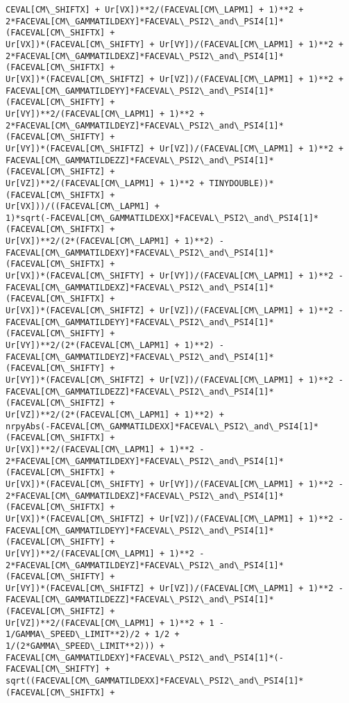 \documentclass[landscape,letterpaper,10pt,english]{article}
\begin{document}
\begin{Verbatim}[commandchars=\\\{\}]
CEVAL[CM\_SHIFTX] + Ur[VX])**2/(FACEVAL[CM\_LAPM1] + 1)**2 +
2*FACEVAL[CM\_GAMMATILDEXY]*FACEVAL\_PSI2\_and\_PSI4[1]*(FACEVAL[CM\_SHIFTX] +
Ur[VX])*(FACEVAL[CM\_SHIFTY] + Ur[VY])/(FACEVAL[CM\_LAPM1] + 1)**2 +
2*FACEVAL[CM\_GAMMATILDEXZ]*FACEVAL\_PSI2\_and\_PSI4[1]*(FACEVAL[CM\_SHIFTX] +
Ur[VX])*(FACEVAL[CM\_SHIFTZ] + Ur[VZ])/(FACEVAL[CM\_LAPM1] + 1)**2 +
FACEVAL[CM\_GAMMATILDEYY]*FACEVAL\_PSI2\_and\_PSI4[1]*(FACEVAL[CM\_SHIFTY] +
Ur[VY])**2/(FACEVAL[CM\_LAPM1] + 1)**2 +
2*FACEVAL[CM\_GAMMATILDEYZ]*FACEVAL\_PSI2\_and\_PSI4[1]*(FACEVAL[CM\_SHIFTY] +
Ur[VY])*(FACEVAL[CM\_SHIFTZ] + Ur[VZ])/(FACEVAL[CM\_LAPM1] + 1)**2 +
FACEVAL[CM\_GAMMATILDEZZ]*FACEVAL\_PSI2\_and\_PSI4[1]*(FACEVAL[CM\_SHIFTZ] +
Ur[VZ])**2/(FACEVAL[CM\_LAPM1] + 1)**2 + TINYDOUBLE))*(FACEVAL[CM\_SHIFTX] +
Ur[VX]))/((FACEVAL[CM\_LAPM1] +
1)*sqrt(-FACEVAL[CM\_GAMMATILDEXX]*FACEVAL\_PSI2\_and\_PSI4[1]*(FACEVAL[CM\_SHIFTX] +
Ur[VX])**2/(2*(FACEVAL[CM\_LAPM1] + 1)**2) -
FACEVAL[CM\_GAMMATILDEXY]*FACEVAL\_PSI2\_and\_PSI4[1]*(FACEVAL[CM\_SHIFTX] +
Ur[VX])*(FACEVAL[CM\_SHIFTY] + Ur[VY])/(FACEVAL[CM\_LAPM1] + 1)**2 -
FACEVAL[CM\_GAMMATILDEXZ]*FACEVAL\_PSI2\_and\_PSI4[1]*(FACEVAL[CM\_SHIFTX] +
Ur[VX])*(FACEVAL[CM\_SHIFTZ] + Ur[VZ])/(FACEVAL[CM\_LAPM1] + 1)**2 -
FACEVAL[CM\_GAMMATILDEYY]*FACEVAL\_PSI2\_and\_PSI4[1]*(FACEVAL[CM\_SHIFTY] +
Ur[VY])**2/(2*(FACEVAL[CM\_LAPM1] + 1)**2) -
FACEVAL[CM\_GAMMATILDEYZ]*FACEVAL\_PSI2\_and\_PSI4[1]*(FACEVAL[CM\_SHIFTY] +
Ur[VY])*(FACEVAL[CM\_SHIFTZ] + Ur[VZ])/(FACEVAL[CM\_LAPM1] + 1)**2 -
FACEVAL[CM\_GAMMATILDEZZ]*FACEVAL\_PSI2\_and\_PSI4[1]*(FACEVAL[CM\_SHIFTZ] +
Ur[VZ])**2/(2*(FACEVAL[CM\_LAPM1] + 1)**2) +
nrpyAbs(-FACEVAL[CM\_GAMMATILDEXX]*FACEVAL\_PSI2\_and\_PSI4[1]*(FACEVAL[CM\_SHIFTX] +
Ur[VX])**2/(FACEVAL[CM\_LAPM1] + 1)**2 -
2*FACEVAL[CM\_GAMMATILDEXY]*FACEVAL\_PSI2\_and\_PSI4[1]*(FACEVAL[CM\_SHIFTX] +
Ur[VX])*(FACEVAL[CM\_SHIFTY] + Ur[VY])/(FACEVAL[CM\_LAPM1] + 1)**2 -
2*FACEVAL[CM\_GAMMATILDEXZ]*FACEVAL\_PSI2\_and\_PSI4[1]*(FACEVAL[CM\_SHIFTX] +
Ur[VX])*(FACEVAL[CM\_SHIFTZ] + Ur[VZ])/(FACEVAL[CM\_LAPM1] + 1)**2 -
FACEVAL[CM\_GAMMATILDEYY]*FACEVAL\_PSI2\_and\_PSI4[1]*(FACEVAL[CM\_SHIFTY] +
Ur[VY])**2/(FACEVAL[CM\_LAPM1] + 1)**2 -
2*FACEVAL[CM\_GAMMATILDEYZ]*FACEVAL\_PSI2\_and\_PSI4[1]*(FACEVAL[CM\_SHIFTY] +
Ur[VY])*(FACEVAL[CM\_SHIFTZ] + Ur[VZ])/(FACEVAL[CM\_LAPM1] + 1)**2 -
FACEVAL[CM\_GAMMATILDEZZ]*FACEVAL\_PSI2\_and\_PSI4[1]*(FACEVAL[CM\_SHIFTZ] +
Ur[VZ])**2/(FACEVAL[CM\_LAPM1] + 1)**2 + 1 - 1/GAMMA\_SPEED\_LIMIT**2)/2 + 1/2 +
1/(2*GAMMA\_SPEED\_LIMIT**2))) +
FACEVAL[CM\_GAMMATILDEXY]*FACEVAL\_PSI2\_and\_PSI4[1]*(-FACEVAL[CM\_SHIFTY] +
sqrt((FACEVAL[CM\_GAMMATILDEXX]*FACEVAL\_PSI2\_and\_PSI4[1]*(FACEVAL[CM\_SHIFTX] +

\end{Verbatim}
\end{document}
